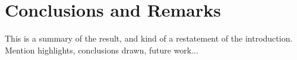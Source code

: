 
\chapter{Conclusions and Remarks}
This is a summary of the result, and kind of a restatement of the introduction. Mention highlights, conclusions drawn, future work...

\clearpage